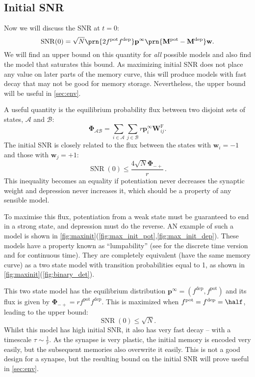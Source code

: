 \documentclass{article} %
\DeclareMathOperator{\snr}{SNR}
\newcommand{\pr}{\mathbf{p}}
\newcommand{\eq}{\pr^\infty}
\newcommand{\w}{\mathbf{w}}
\newcommand{\W}{\mathbf{W}}
\newcommand{\M}{\mathbf{M}}
\newcommand{\frg}{\W^{\mathrm{F}}}
\newcommand{\F}{\boldsymbol{\Phi}}
\newcommand{\pot}{^{\text{pot}}}
\newcommand{\dep}{^{\text{dep}}}
\newcommand{\CA}{\mathcal{A}}
\newcommand{\CB}{\mathcal{B}}
\begin{document}
\subsection{Initial SNR}\label{sec:initial}

Now we will discuss the SNR at $t=0$:
%
\begin{equation}\label{eq:init}
  \snr(0) = \sqrt{N}\prn{2 f\pot f\dep} \eq \prn{\M\pot-\M\dep} \w.
\end{equation}
%
We will find an upper bound on this quantity for \emph{all} possible models and also find the model that saturates this bound.
As maximizing initial SNR does not place any value on later parts of the memory curve, this will produce models with fast decay that may not be good for memory storage.
Nevertheless, the upper bound will be useful in \autoref{sec:env}.

A useful quantity is the equilibrium probability flux between two disjoint sets of states, $\CA$ and $\CB$:
%
\begin{equation}\label{eq:flux}
  \F_{\CA\CB} = \sum_{i\in\CA} \sum_{j\in\CB} r \eq_i \frg_{ij}.
\end{equation}
%
The initial SNR is closely related to the flux between the states with $\w_i=-1$ and those with $\w_j=+1$:
%
\begin{equation}\label{eq:initflux}
  \snr(0) \leq \frac{4\sqrt{N}\F_{-+}}{r}\,.
\end{equation}
%
This inequality becomes an equality if potentiation never decreases the synaptic weight and depression never increases it, which should be a property of any sensible model.

To maximise this flux, potentiation from a weak state must be guaranteed to end in a strong state, and depression must do the reverse.
AN example of such a model is shown in \autoref{fig:maxinit}(\ref{fig:max_init_pot},\ref{fig:max_init_dep}).
These models have a property known as ``lumpability'' (see \cite[\S6.3]{kemeny1960finite} for the discrete time version and \cite{burke1958markovian,Ball1993Lumpability} for continuous time).
They are completely equivalent (\ie have the same memory curve) as a two state model with transition probabilities equal to 1, as shown in \autoref{fig:maxinit}(\ref{fig:binary_det}).

This two state model has the equilibrium distribution $\eq=(f\dep,f\pot)$ and its flux is given by $\F_{-+} = rf\pot f\dep$.
This is maximized when $f\pot=f\dep=\half$, leading to the upper bound:
%
\begin{equation}\label{eq:maxinit}
  \snr(0) \leq \sqrt{N}.
\end{equation}
%
Whilst this model has high initial SNR, it also has very fast decay -- with a timescale $\tau\sim\frac{1}{r}$.
As the synapse is very plastic, the initial memory is encoded very easily, but the subsequent memories also overwrite it easily.
This is not a good design for a synapse, but the resulting bound on the initial SNR will prove useful in \autoref{sec:env}.
\end{document}
